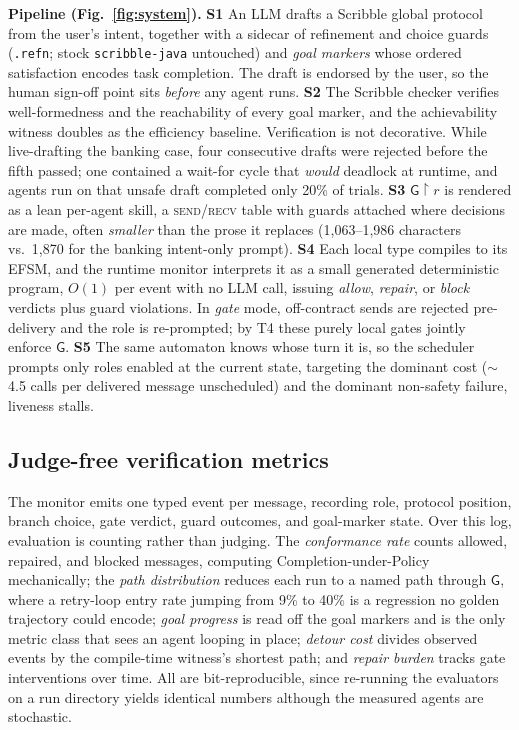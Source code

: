 \documentclass{article}
\newcommand{\gtG}{\mathsf{G}}
\newcommand{\proj}[2]{#1\!\upharpoonright\!#2}
\begin{document}
\textbf{Pipeline (Fig.~\ref{fig:system}).} \textbf{S1} An LLM drafts a Scribble global protocol from the user's intent, together with a sidecar of refinement and choice guards (\texttt{.refn}; stock \texttt{scribble-java} untouched) and \emph{goal markers} whose ordered satisfaction encodes task completion. The draft is endorsed by the user, so the human sign-off point sits \emph{before} any agent runs. \textbf{S2} The Scribble checker verifies well-formedness and the reachability of every goal marker, and the achievability witness doubles as the efficiency baseline. Verification is not decorative. While live-drafting the banking case, four consecutive drafts were rejected before the fifth passed; one contained a wait-for cycle that \emph{would} deadlock at runtime, and agents run on that unsafe draft completed only 20\% of trials. \textbf{S3} $\proj{\gtG}{r}$ is rendered as a lean per-agent skill, a \textsc{send}/\textsc{recv} table with guards attached where decisions are made, often \emph{smaller} than the prose it replaces (1{,}063--1{,}986 characters vs.\ 1{,}870 for the banking intent-only prompt). \textbf{S4} Each local type compiles to its EFSM, and the runtime monitor interprets it as a small generated deterministic program, $O(1)$ per event with no LLM call, issuing \emph{allow}, \emph{repair}, or \emph{block} verdicts plus guard violations. In \emph{gate} mode, off-contract sends are rejected pre-delivery and the role is re-prompted; by T4 these purely local gates jointly enforce $\gtG$. \textbf{S5} The same automaton knows whose turn it is, so the scheduler prompts only roles enabled at the current state, targeting the dominant cost ($\sim$4.5 calls per delivered message unscheduled) and the dominant non-safety failure, liveness stalls.

\subsection{Judge-free verification metrics}\label{sec:method}
The monitor emits one typed event per message, recording role, protocol position, branch choice, gate verdict, guard outcomes, and goal-marker state. Over this log, evaluation is counting rather than judging. The \emph{conformance rate} counts allowed, repaired, and blocked messages, computing Completion-under-Policy mechanically; the \emph{path distribution} reduces each run to a named path through $\gtG$, where a retry-loop entry rate jumping from 9\% to 40\% is a regression no golden trajectory could encode; \emph{goal progress} is read off the goal markers and is the only metric class that sees an agent looping in place; \emph{detour cost} divides observed events by the compile-time witness's shortest path; and \emph{repair burden} tracks gate interventions over time. All are bit-reproducible, since re-running the evaluators on a run directory yields identical numbers although the measured agents are stochastic.
\end{document}
